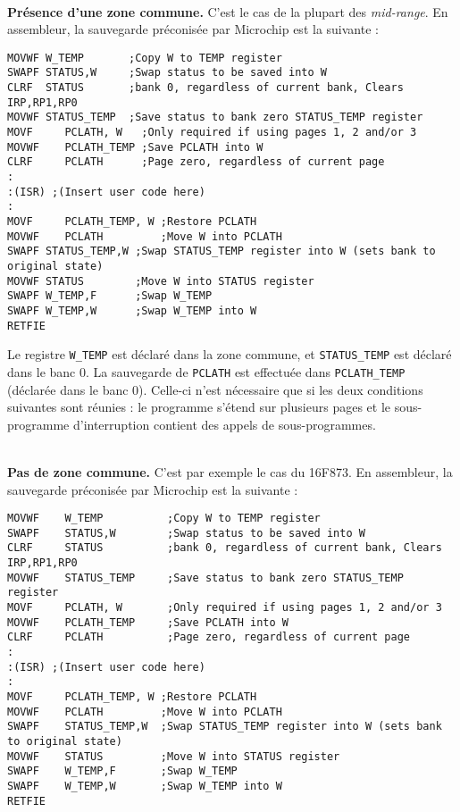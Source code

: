 ~\\
\textbf{Présence d’une zone commune.} C'est le cas de la plupart des \emph{mid-range}. En assembleur, la sauvegarde préconisée par Microchip est la suivante :

\begin{lstlisting}[language=assembleur]
MOVWF W_TEMP       ;Copy W to TEMP register 
SWAPF STATUS,W     ;Swap status to be saved into W 
CLRF  STATUS       ;bank 0, regardless of current bank, Clears IRP,RP1,RP0 
MOVWF STATUS_TEMP  ;Save status to bank zero STATUS_TEMP register 
MOVF     PCLATH, W   ;Only required if using pages 1, 2 and/or 3 
MOVWF    PCLATH_TEMP ;Save PCLATH into W 
CLRF     PCLATH      ;Page zero, regardless of current page 
: 
:(ISR) ;(Insert user code here) 
: 
MOVF     PCLATH_TEMP, W ;Restore PCLATH 
MOVWF    PCLATH         ;Move W into PCLATH 
SWAPF STATUS_TEMP,W ;Swap STATUS_TEMP register into W (sets bank to original state) 
MOVWF STATUS        ;Move W into STATUS register 
SWAPF W_TEMP,F      ;Swap W_TEMP 
SWAPF W_TEMP,W      ;Swap W_TEMP into W
RETFIE
\end{lstlisting}

Le registre \texttt{W\_TEMP} est déclaré dans la zone commune, et \texttt{STATUS\_TEMP} est déclaré dans le banc 0. La sauvegarde de \texttt{PCLATH} est effectuée dans \texttt{PCLATH\_TEMP} (déclarée dans le banc 0). Celle-ci n'est nécessaire que si les deux conditions suivantes sont réunies : le programme s’étend sur plusieurs pages et le sous-programme d’interruption contient des appels de sous-programmes.


~\\
\textbf{Pas de zone commune.} C’est par exemple le cas du 16F873. En assembleur, la sauvegarde préconisée par Microchip est la suivante :


\begin{lstlisting}[language=assembleur]
MOVWF    W_TEMP          ;Copy W to TEMP register 
SWAPF    STATUS,W        ;Swap status to be saved into W 
CLRF     STATUS          ;bank 0, regardless of current bank, Clears IRP,RP1,RP0 
MOVWF    STATUS_TEMP     ;Save status to bank zero STATUS_TEMP register 
MOVF     PCLATH, W       ;Only required if using pages 1, 2 and/or 3 
MOVWF    PCLATH_TEMP     ;Save PCLATH into W 
CLRF     PCLATH          ;Page zero, regardless of current page 
: 
:(ISR) ;(Insert user code here) 
: 
MOVF     PCLATH_TEMP, W ;Restore PCLATH 
MOVWF    PCLATH         ;Move W into PCLATH 
SWAPF    STATUS_TEMP,W  ;Swap STATUS_TEMP register into W (sets bank to original state) 
MOVWF    STATUS         ;Move W into STATUS register 
SWAPF    W_TEMP,F       ;Swap W_TEMP 
SWAPF    W_TEMP,W       ;Swap W_TEMP into W
RETFIE
\end{lstlisting}

